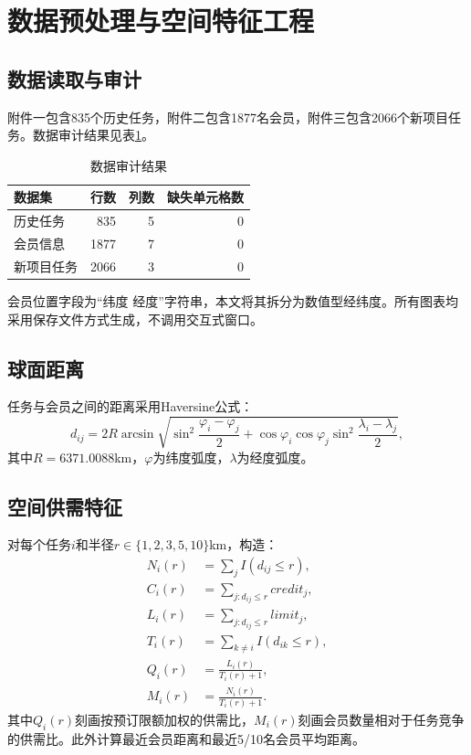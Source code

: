 \documentclass[UTF8,a4paper,12pt]{ctexart}
\begin{document}
\section{数据预处理与空间特征工程}
\subsection{数据读取与审计}
附件一包含835个历史任务，附件二包含1877名会员，附件三包含2066个新项目任务。数据审计结果见表\ref{tab:audit}。

\begin{table}[H]
\centering
\caption{数据审计结果}
\label{tab:audit}
\begin{tabular}{lrrr}
\toprule
数据集 & 行数 & 列数 & 缺失单元格数\\
\midrule
历史任务 & 835 & 5 & 0\\
会员信息 & 1877 & 7 & 0\\
新项目任务 & 2066 & 3 & 0\\
\bottomrule
\end{tabular}
\end{table}

会员位置字段为``纬度 经度''字符串，本文将其拆分为数值型经纬度。所有图表均采用保存文件方式生成，不调用交互式窗口。

\subsection{球面距离}
任务与会员之间的距离采用Haversine公式：
\begin{equation}
 d_{ij}=2R\arcsin\sqrt{\sin^2\frac{\varphi_i-\varphi_j}{2}+\cos\varphi_i\cos\varphi_j\sin^2\frac{\lambda_i-\lambda_j}{2}},
\end{equation}
其中$R=6371.0088$km，$\varphi$为纬度弧度，$\lambda$为经度弧度。

\subsection{空间供需特征}
对每个任务$i$和半径$r\in\{1,2,3,5,10\}$km，构造：
\begin{align}
N_i(r)&=\sum_j I(d_{ij}\le r),\\
C_i(r)&=\sum_{j:d_{ij}\le r} credit_j,\\
L_i(r)&=\sum_{j:d_{ij}\le r} limit_j,\\
T_i(r)&=\sum_{k\ne i} I(d_{ik}\le r),\\
Q_i(r)&=\frac{L_i(r)}{T_i(r)+1},\\
M_i(r)&=\frac{N_i(r)}{T_i(r)+1}.
\end{align}
其中$Q_i(r)$刻画按预订限额加权的供需比，$M_i(r)$刻画会员数量相对于任务竞争的供需比。此外计算最近会员距离和最近5/10名会员平均距离。
\end{document}
